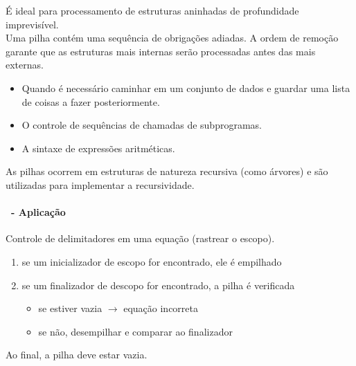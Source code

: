 

\begin{frame}
	É ideal para processamento de estruturas aninhadas de profundidade imprevisível.
	\\\pause\vfill
	Uma pilha contém uma sequência de  obrigações adiadas. A ordem de remoção garante que as  estruturas mais internas serão processadas antes das mais externas.
		\begin{itemize}
			\item Quando é necessário caminhar em um conjunto de dados e guardar uma lista de coisas a fazer posteriormente.
			\item O controle de sequências de chamadas de subprogramas.
			\item A sintaxe de expressões aritméticas.
		\end{itemize}
	\pause\vfill
	As pilhas ocorrem em estruturas de natureza recursiva (como árvores) e  são utilizadas para implementar a recursividade.
\end{frame}

\begin{frame}
	\framesubtitle{\subsecname\ - Aplicação}
	Controle de delimitadores em uma equação (rastrear o escopo).
	\pause\vfill
	\begin{enumerate}
		\item se um inicializador de escopo for encontrado, ele é empilhado
		\item se um finalizador de descopo for encontrado, a pilha é verificada
			\begin{itemize}
				\item se estiver vazia $\rightarrow$ equação incorreta
				\item se não, desempilhar e comparar ao finalizador
			\end{itemize}
	\end{enumerate}
	\vfill
	Ao final, a pilha deve estar vazia.
\end{frame}


